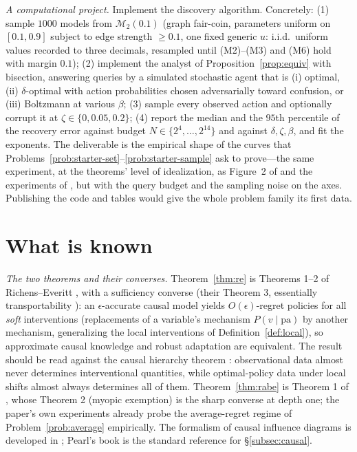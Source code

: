 \documentclass[11pt]{amsart}
\theoremstyle{plain}
\theoremstyle{definition}
\newcommand{\MM}{\mathcal{M}}
\begin{document}
\medskip
\noindent\emph{A computational project.} Implement the discovery algorithm. Concretely: (1) sample $1000$ models from $\MM_2(0.1)$ (graph fair-coin, parameters uniform on $[0.1,0.9]$ subject to edge strength $\ge0.1$, one fixed generic $u$: i.i.d.\ uniform values recorded to three decimals, resampled until (M2)--(M3) and (M6) hold with margin $0.1$); (2) implement the analyst of Proposition~\ref{prop:equiv} with bisection, answering queries by a simulated stochastic agent that is (i) optimal, (ii) $\delta$-optimal with action probabilities chosen adversarially toward confusion, or (iii) Boltzmann at various $\beta$; (3) sample every observed action and optionally corrupt it at $\zeta\in\{0,0.05,0.2\}$; (4) report the median and the $95$th percentile of the recovery error against budget $N\in\{2^4,\dots,2^{14}\}$ and against $\delta,\zeta,\beta$, and fit the exponents. The deliverable is the empirical shape of the curves that Problems~\ref{prob:starter-set}--\ref{prob:starter-sample} ask to prove---the same experiment, at the theorems' level of idealization, as Figure~2 of \cite{richens2024} and the experiments of \cite{richens2025}, but with the query budget and the sampling noise on the axes. Publishing the code and tables would give the whole problem family its first data.

\section{What is known}\label{sec:known}

\emph{The two theorems and their converses.} Theorem~\ref{thm:re} is Theorems 1--2 of Richens--Everitt \cite{richens2024}, with a sufficiency converse (their Theorem 3, essentially transportability \cite{bareinboim2022}): an $\epsilon$-accurate causal model yields $O(\epsilon)$-regret policies for all \emph{soft} interventions (replacements of a variable's mechanism $P(v\mid\mathrm{pa})$ by another mechanism, generalizing the local interventions of Definition~\ref{def:local}), so approximate causal knowledge and robust adaptation are equivalent. The result should be read against the causal hierarchy theorem \cite{bareinboim2022}: observational data almost never determines interventional quantities, while optimal-policy data under local shifts almost always determines all of them. Theorem~\ref{thm:rabe} is Theorem 1 of \cite{richens2025}, whose Theorem 2 (myopic exemption) is the sharp converse at depth one; the paper's own experiments already probe the average-regret regime of Problem~\ref{prob:average} empirically. The formalism of causal influence diagrams is developed in \cite{everitt2021}; Pearl's book \cite{pearl2009} is the standard reference for \S\ref{subsec:causal}.
\end{document}
